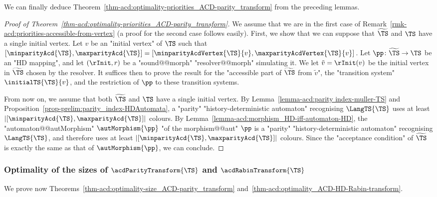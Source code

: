 \documentclass[10pt,a4paper]{amsart}
\begin{document}
We can finally deduce Theorem~\ref{thm-acd:optimality-priorities_ACD-parity_transform} from the preceding lemmas.
\begin{proof}[Proof of Theorem~\ref{thm-acd:optimality-priorities_ACD-parity_transform}]
	We assume that we are in the first case of Remark~\ref{rmk-acd:priorities-accessible-from-vertex} (a proof for the second case follows easily). First, we show that we can suppose that $\widetilde{\TS}$ and $\TS$ have a single initial vertex. Let $v$ be an "initial vertex" of $\TS$ such that $[\minparityAcd{\TS}, \maxparityAcd{\TS}] = [\minparityAcdVertex{\TS}{v}, \maxparityAcdVertex{\TS}{v}]$. 
	Let $\pp\colon \widetilde{\TS} \to \TS$ be an "HD mapping", and let $(\rInit, r)$ be a "sound@@morph" "resolver@@morph" simulating it. We let $\tilde{v} = \rInit(v)$ be the initial vertex in $\widetilde{\TS}$ chosen by the resolver. It suffices then to prove the result for the "accessible part of $\widetilde{\TS}$ from $\tilde{v}$", the "transition system" $\initialTS{\TS}{v}$,  and the restriction of $\pp$ to these transition systems. 
	
	From now on, we assume that both $\widetilde{\TS}$ and $\TS$ have a single initial vertex.
	By Lemma~\ref{lemma-acd:parity index-muller-TS} and Proposition~\ref{prop-prelim:parity_index-HDAutomata}, a "parity" "history-deterministic automaton" recognising $\LangTS{\TS}$ uses at least $|[\minparityAcd{\TS}, \maxparityAcd{\TS}]|$ colours. By Lemma~\ref{lemma-acd:morphism_HD-iff-automaton-HD}, the "automaton@@autMorphism" $\autMorphism{\pp}$ "of the morphism@@aut" $\pp$ is a "parity" "history-deterministic automaton" recognising $\LangTS{\TS}$, and therefore uses at least $|[\minparityAcd{\TS}, \maxparityAcd{\TS}]|$ colours. Since the "acceptance condition" of $\widetilde{\TS}$ is exactly the same as that of $\autMorphism{\pp}$, we can conclude.
\end{proof}



\subsubsection{Optimality of the sizes \texorpdfstring{of $\acdParityTransform{\TS}$ and $\acdRabinTransform{\TS}$}{}}
We prove now Theorems~\ref{thm-acd:optimality-size_ACD-parity_transform} and~\ref{thm-acd:optimality_ACD-HD-Rabin-transform}. 
\end{document}
